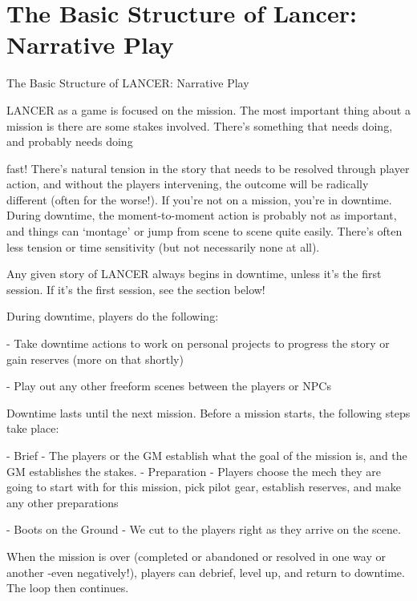 \part{The Basic Structure of Lancer: Narrative Play} 

          The Basic Structure of LANCER:  
                               Narrative Play  

 LANCER as a game is focused on the mission. The most important thing about a mission is  
there are some stakes involved. There’s something that needs doing, and probably needs doing  

                                                                                           


fast! There’s natural tension in the story that needs to be resolved through player action, and  
without the players intervening, the outcome will be radically different (often for the worse!). If  
you’re not on a mission, you’re in downtime. During downtime, the moment-to-moment action is  
probably not as important, and things can ‘montage’ or jump from scene to scene quite easily.  
There’s often less tension or time sensitivity (but not necessarily none at all).   

Any given story of LANCER always begins in downtime, unless it’s the first session. If it’s the first  
session, see the section below!
 

During downtime, players do the following:
 
     -   Take downtime actions to work on personal projects to progress the story or gain  
         reserves (more on that shortly)
 
     -   Play out any other freeform scenes between the players or NPCs
 

Downtime lasts until the next mission. Before a mission starts, the following steps take place:
 
         	- Brief - The players or the GM establish what the goal of the mission is, and the GM  
         establishes the stakes.  
         - Preparation - Players choose the mech they are going to start with for this mission,  
         pick pilot gear, establish reserves, and make any other preparations
 
         	- Boots on the Ground - We cut to the players right as they arrive on the scene.
 

When the mission is over (completed or abandoned or resolved in one way or another -even  
negatively!), players can debrief, level up, and return to downtime. The loop then continues.
 

